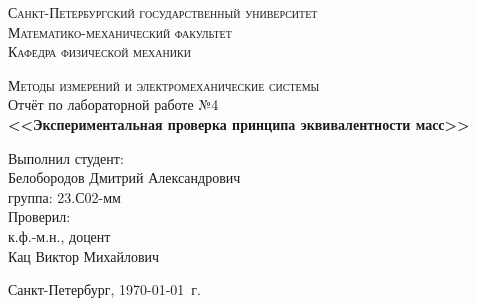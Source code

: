 \begin{titlepage}
\begin{center}
\textsc{Санкт-Петербургский государственный университет\\
Математико-механический факультет\\
Кафедра физической механики\\}

\vfill

\textsc{Методы измерений и электромеханические системы\\[3mm]}
Отчёт по лабораторной работе №4\\[6mm]


\textbf{\large<<Экспериментальная проверка принципа эквивалентности масс>>}

\vfill
\end{center}

\hfill
\begin{minipage}{.5\textwidth}
Выполнил студент:\\[2mm] 
Белобородов Дмитрий Александрович\\
группа: 23.С02-мм\\[5mm]

Проверил:\\[2mm] 
к.ф.-м.н., доцент\\
Кац Виктор Михайлович
\end{minipage}%
\vfill
\begin{center}
 Санкт-Петербург, \yeardate\today\ г.
\end{center}
\end{titlepage}